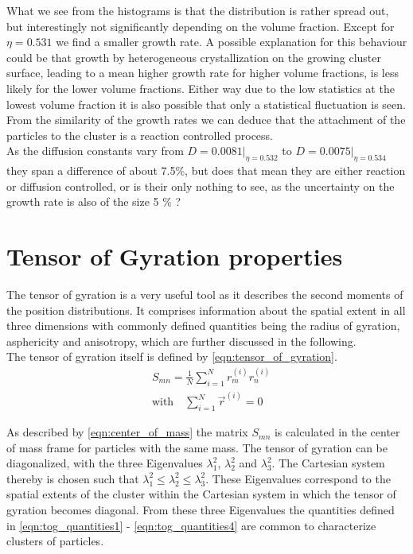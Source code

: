 What we see from the histograms is that the distribution is rather spread out, but interestingly not significantly depending on the volume fraction. Except for $\eta = 0.531$ we find a smaller growth rate. A possible explanation for this behaviour could be that growth by heterogeneous crystallization on the growing cluster surface, leading to a mean higher growth rate for higher volume fractions, is less likely for the lower volume fractions. Either way due to the low statistics at the lowest volume fraction it is also possible that only a statistical fluctuation is seen. From the similarity of the growth rates we can deduce that the attachment of the particles to the cluster is a reaction controlled process.  \\

As the diffusion constants vary from $D=0.0081|_{\eta = 0.532}$ to $D=0.0075|_{\eta = 0.534}$ they span a difference of about 7.5\%, but does that mean they are either reaction or diffusion controlled, or is their only nothing to see, as the uncertainty on the growth rate is also of the size 5 \% ?

\section{Tensor of Gyration properties}
\label{sec:tog}
The tensor of gyration is a very useful tool as it describes the second moments of the position distributions. It comprises information about the spatial extent in all three dimensions with commonly  defined quantities being the radius of gyration, asphericity and anisotropy\cite{Theodorou1985}, which are further discussed in the following.\\

The tensor of gyration itself is defined by \autoref{eqn:tensor_of_gyration}.
\begin{align}
\label{eqn:tensor_of_gyration}
&S_{mn}=\frac{1}{N} \sum_{i=1}^{N} r^{(i)}_m r^{(i)}_n\\
\label{eqn:center_of_mass}
&\text{with} \quad \sum_{i=1}^{N} \vec{r}^{(i)} = 0
\end{align}

As described by \autoref{eqn:center_of_mass} the matrix $S_{mn}$ is calculated in the center of mass frame for particles with the same mass. The tensor of gyration can be diagonalized, with the three Eigenvalues $\lambda_1^2$, $\lambda_2^2$ and $\lambda_3^2$. The Cartesian system thereby is chosen such that $\lambda_1^2 \leq \lambda_2^2 \leq \lambda_3^2 $. These Eigenvalues correspond to the spatial extents of the cluster within the Cartesian system in which the tensor of gyration becomes diagonal. From these three Eigenvalues the quantities defined in \autoref{eqn:tog_quantities1} - \ref{eqn:tog_quantities4} are common to characterize clusters of particles.

